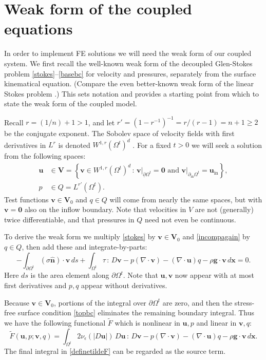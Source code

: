 \documentclass[letterpaper,final,12pt,reqno]{amsart}
\newcommand{\eps}{\epsilon}
\newcommand{\hbn}{\hat{\mathbf{n}}}
\newcommand{\bu}{\mathbf{u}}
\newcommand{\bv}{\mathbf{v}}
\newcommand{\bx}{\mathbf{x}}
\newcommand{\bV}{\mathbf{V}}
\newcommand{\bzero}{\bm{0}}
\begin{document}
\section{Weak form of the coupled equations} \label{sec:weakformcoupled}

In order to implement FE solutions we will need the weak form of our coupled system.  We first recall the well-known weak form of the decoupled Glen-Stokes problem \eqref{stokes}--\eqref{basebc} \cite{JouvetRappaz2011} for velocity and pressures, separately from the surface kinematical equation.  (Compare the even better-known weak form of the linear Stokes problem \cite{Bueler2021,Elmanetal2014}.)  This sets notation and provides a starting point from which to state the weak form of the coupled model.

Recall $r=(1/n) + 1>1$, and let $r'=(1-r^{-1})^{-1}=r/(r-1)=n+1\ge 2$ be the conjugate exponent.  The Sobolev space of velocity fields with first derivatives in $L^r$ is denoted $W^{1,r}(\Omega^t)^d$ \cite{Evans2010}.  For a fixed $t>0$ we will seek a solution from the following spaces:
\begin{align*}
\bu &\in \bV = \left\{\bv \in W^{1,r}(\Omega^t)^d\,:\,\bv\big|_{\underline{\partial} \Omega^t}=\bzero \text{ and } \bv\big|_{\partial_{\text{in}} \Omega^t} = \bu_{\text{in}}\right\}, \\
p &\in Q = L^{r'}(\Omega^t).
\end{align*}
Test functions $\bv \in \bV_0$ and $q\in Q$ will come from nearly the same spaces, but with $\bv=\bzero$ also on the inflow boundary.  Note that velocities in $V$ are not (generally) twice differentiable, and that pressures in $Q$ need not even be continuous.

To derive the weak form we multiply \eqref{stokes} by $\bv\in \bV_0$ and \eqref{incompagain} by $q\in Q$, then add these and integrate-by-parts:
\begin{equation}
-\int_{\partial\Omega^t} (\sigma \hbn)\cdot \bv\,ds + \int_{\Omega^t} \tau \,:\,D\bv - p (\nabla \cdot \bv) - \left(\nabla \cdot \bu\right) q - \rho \mathbf{g} \cdot \bv \,d\bx = 0. \label{nonfunctwo}
\end{equation}
Here $ds$ is the area element along $\partial\Omega^t$.  Note that $\bu,\bv$ now appear with at most first derivatives and $p,q$ appear without derivatives.

Because $\bv\in \bV_0$, portions of the integral over $\partial\Omega^t$ are zero, and then the stress-free surface condition \eqref{topbc} eliminates the remaining boundary integral.  Thus we have the following functional $\tilde F$ which is nonlinear in $\bu,p$ and linear in $\bv,q$:
\begin{equation}
\tilde F(\bu,p;\bv,q) = \int_{\Omega^t} 2 \nu_\eps(|D\bu|)\, D\bu\,:\,D\bv - p (\nabla \cdot \bv) - \left(\nabla \cdot \bu\right) q - \rho \mathbf{g} \cdot \bv \,d\bx. \label{definetildeF}
\end{equation}
The final integral in \eqref{definetildeF} can be regarded as the source term.
\end{document}
